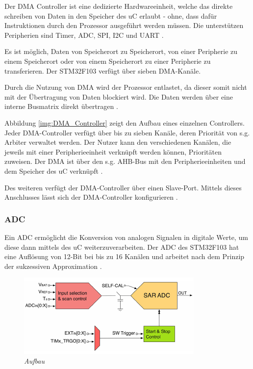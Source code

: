 Der \acl{DMA} Controller ist eine dedizierte Hardwareeinheit, welche das direkte schreiben von Daten in den Speicher des \ac{uC} erlaubt - ohne, dass dafür Instruktionen durch den Prozessor
ausgeführt werden müssen. Die unterstützen Peripherien sind Timer, \acs{ADC}, \ac{SPI}, \acs{I2C} und \acs{UART} \citep{STM32_Datasheet}.

\smallskip

Es ist möglich, Daten von Speicherort zu Speicherort, von einer Peripherie zu einem Speicherort oder von einem Speicherort zu einer Peripherie
zu transferieren. Der STM32F103 verfügt über sieben \ac{DMA}-Kanäle.

\smallskip

Durch die Nutzung von \ac{DMA} wird der Prozessor entlastet, da dieser somit nicht mit der Übertragung von Daten blockiert wird. Die Daten werden 
über eine interne Busmatrix direkt übertragen \citep{MasteringSTM}.

\smallskip

Abbildung \ref{img:DMA_Controller} zeigt den Aufbau eines einzelnen Controllers. Jeder \ac{DMA}-Controller verfügt über bis zu sieben Kanäle, deren Priorität von s.g. Arbiter verwaltet werden. Der Nutzer kann den verschiedenen Kanälen,
die jeweils mit einer Peripherieeinheit verknüpft werden können, Prioritäten zuweisen. Der \ac{DMA} ist über den s.g. \acs{AHB-Bus} mit den 
Peripherieeinheiten und dem Speicher des \ac{uC} verknüpft \citep{MasteringSTM}.

\smallskip

Des weiteren verfügt der \ac{DMA}-Controller über einen Slave-Port. Mittels dieses Anschlusses lässt sich der \ac{DMA}-Controller konfigurieren \citep{MasteringSTM}.

\newpage

\subsubsection{ADC}

Ein \acl{ADC} ermöglicht die Konversion von analogen Signalen in digitale Werte, um diese dann mittels des \ac{uC} weiterzuverarbeiten. 
Der \ac{ADC} des STM32F103 hat eine Auflösung von 12-Bit bei bis zu 16 Kanälen und arbeitet nach dem Prinzip der sukzessiven Approximation \citep{STM32_Datasheet}.

\smallskip


\begin{figure}[h]
     \vspace{-\baselineskip}
         \centering
         \includegraphics[scale=0.6]{Pictures/adc.png}
         \caption{\textit{Aufbau \citep{MasteringSTM}}}
         \label{img:ADC}
\end{figure}



